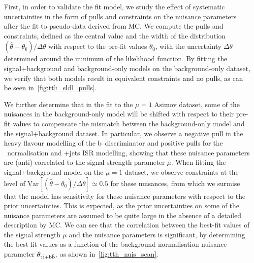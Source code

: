 First, in order to validate the fit model, we study the effect of systematic uncertainties in the form of pulls and constraints on the nuisance parameters after the fit to pseudo-data derived from MC. We compute the pulls and constraints, defined as the central value and the width of the distribution $(\hat{\theta} - \theta_0) / \Delta\theta$ with respect to the pre-fit values $\theta_0$, with the uncertainty $\Delta\theta$ determined around the minimum of the likelihood function. By fitting the signal+background and background-only models on the background-only dataset, we verify that both models result in equivalent constraints and no pulls, as can be seen in~\cref{fig:tth_sldl_pulls}.

We further determine that in the fit to the $\mu=1$ Asimov dataset, some of the nuisances in the background-only model will be shifted with respect to their pre-fit values to compensate the mismatch between the background-only model and the signal+background dataset. In particular, we observe a negative pull in the heavy flavour modelling of the b~discriminator and positive pulls for the \ttbb~normalisation and \ttbar+jets ISR modelling, showing that these nuisance parameters are (anti)-correlated to the signal strength parameter $\mu$. When fitting the signal+background model on the $\mu=1$ dataset, we observe constraints at the level of $\mathrm{Var}[(\hat{\theta} - \theta_0)/\Delta \theta] \simeq 0.5$ for these nuisances, from which we surmise that the model has sensitivity for these nuisance parameters with respect to the prior uncertainties. This is expected, as the prior uncertainties on some of the nuisance parameters are assumed to be quite large in the absence of a detailed description by MC. We can see that the correlation between the best-fit values of the signal strength $\mu$ and the nuisance parameters is significant, by determining the best-fit values as a function of the \ttbb\xspace background normalisation nuisance parameter $\theta_{\mathrm{t} \bar{\mathrm{t}} + \mathrm{b}\bar{\mathrm{b}}}$, as shown in~\cref{fig:tth_nuis_scan}.

